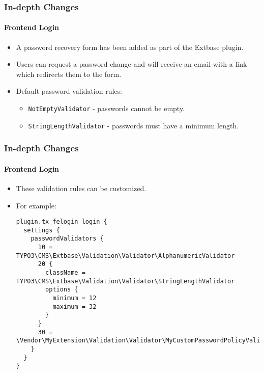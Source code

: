 
\begin{frame}[fragile]
	\frametitle{In-depth Changes}
	\framesubtitle{Frontend Login}

	\begin{itemize}

		\item A password recovery form has been added as part of the Extbase plugin.
		\item Users can request a password change and will receive an email with a link which redirects them to the form.
		\item Default password validation rules:

			\begin{itemize}
				\item \texttt{NotEmptyValidator} - passwords cannot be empty.
				\item \texttt{StringLengthValidator} - passwords must have a minimum length.
			\end{itemize}

	\end{itemize}

\end{frame}


\begin{frame}[fragile]
	\frametitle{In-depth Changes}
	\framesubtitle{Frontend Login}

	\lstset{basicstyle=\tiny\ttfamily}

	\begin{itemize}
		\item These validation rules can be customized.
		\item For example:
\begin{lstlisting}
plugin.tx_felogin_login {
  settings {
    passwordValidators {
      10 = TYPO3\CMS\Extbase\Validation\Validator\AlphanumericValidator
      20 {
        className = TYPO3\CMS\Extbase\Validation\Validator\StringLengthValidator
        options {
          minimum = 12
          maximum = 32
        }
      }
      30 = \Vendor\MyExtension\Validation\Validator\MyCustomPasswordPolicyValidator
    }
  }
}
\end{lstlisting}

	\end{itemize}

\end{frame}

